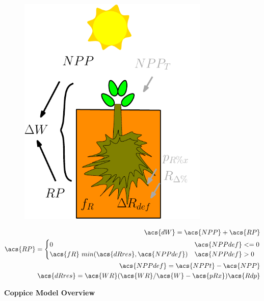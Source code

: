 \documentclass[10pt]{article}
\begin{document}
\begin{figure}[!ht]
  \centering
\begin{subfigure}[b]{.2\linewidth}
  \includegraphics[width=1.0\linewidth]{img/tree_pics_10}
\end{subfigure}
\quad
\begin{subtable}[b]{.75\linewidth}
\begin{align}
\acs{dW}=\acs{NPP}+\acs{RP} \\
\acs{RP} = \begin{cases} 0 & \acs{NPPdef} <=0 \\
\acs{fR} ~ min (\acs{dRres} ,\acs{NPPdef}) & \acs{NPPdef} > 0  
\end{cases} \\
\acs{NPPdef} = \acs{NPPt}-\acs{NPP} \\
\acs{dRres} = \acs{WR}(\acs{WR}/\acs{W} - \acs{pRx})\acs{Rdp}
\end{align}
\end{subtable}
\caption{\textbf{Coppice Model Overview}}
\label{fig:coppice}
\end{figure}
\end{document}
